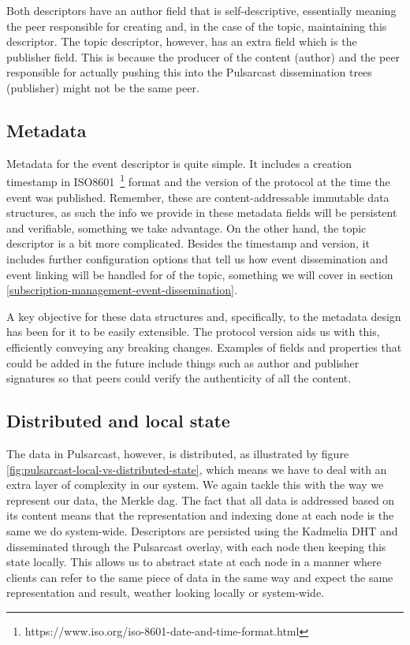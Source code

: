 Both descriptors have an author field that is self-descriptive, essentially
meaning the peer responsible for creating and, in the case of the topic,
maintaining this descriptor. The topic descriptor, however, has an extra field
which is the publisher field. This is because the producer of the content
(author) and the peer responsible for actually pushing this into the Pulsarcast
dissemination trees (publisher) might not be the same peer.

\subsection{Metadata}\label{subsec:metadata}

Metadata for the event descriptor is quite simple. It includes a creation
timestamp in
ISO8601~\footnote{https://www.iso.org/iso-8601-date-and-time-format.html}
format and the version of the protocol at the time the event was published.
Remember, these are content-addressable immutable data structures, as such the
info we provide in these metadata fields will be persistent and verifiable,
something we take advantage. On the other hand, the topic descriptor is a bit
more complicated. Besides the timestamp and version, it includes further
configuration options that tell us how event dissemination and event linking
will be handled for of the topic, something we will cover in section
\ref{subscription-management-event-dissemination}.

A key objective for these data structures and, specifically, to the metadata
design has been for it to be easily extensible. The protocol version aids us
with this, efficiently conveying any breaking changes. Examples of fields and
properties that could be added in the future include things such as author and
publisher signatures so that peers could verify the authenticity of all the
content.

\subsection{Distributed and local state}\label{subsec:distributed-and-local-state}

The data in Pulsarcast, however, is distributed, as illustrated by figure
\ref{fig:pulsarcast-local-vs-distributed-state}, which means we have to deal
with an extra layer of complexity in our system. We again tackle this with the
way we represent our data, the Merkle \acrshort{dag}. The fact that all data is addressed
based on its content means that the representation and indexing done at each
node is the same we do system-wide. Descriptors are persisted using the
Kadmelia DHT and disseminated through the Pulsarcast overlay, with each node
then keeping this state locally. This allows us to abstract state at each node
in a manner where clients can refer to the same piece of data in the same way
and expect the same representation and result, weather looking locally or
system-wide.

